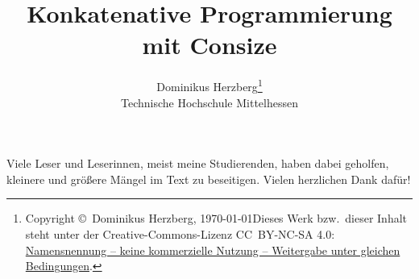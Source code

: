 \documentclass[a4paper]{refrep}
\theoremstyle{plain}
\begin{document}
\title{\bf Konkatenative Programmierung mit Consize}
\author{Dominikus Herzberg\thanks{%
Copyright \copyright\ Dominikus Herzberg, \today\medskip\newline Dieses Werk bzw.\ dieser Inhalt steht unter der Creative-Commons-Lizenz CC~BY-NC-SA 4.0: \href{https://creativecommons.org/licenses/by-nc-sa/4.0/}{Namensnennung -- keine kommerzielle Nutzung -- Weitergabe unter gleichen Bedingungen}.}%
\\Technische Hochschule Mittelhessen}
\date{}
\maketitle

Viele Leser und Leserinnen, meist meine Studierenden, haben dabei geholfen, kleinere und größere Mängel im Text zu beseitigen. Vielen herzlichen Dank dafür!

\newpage

\tableofcontents











\appendix





%
%
\end{document}
